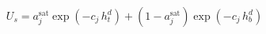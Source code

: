 \begin{equation}\label{eq:us2}
U_s= a_j^\mathrm{sat} \exp (-c_j \, h_t^d ) + (\mathrm{1}-a_j^\mathrm{sat})  \exp (-c_j \, h_b^d )
\end{equation}